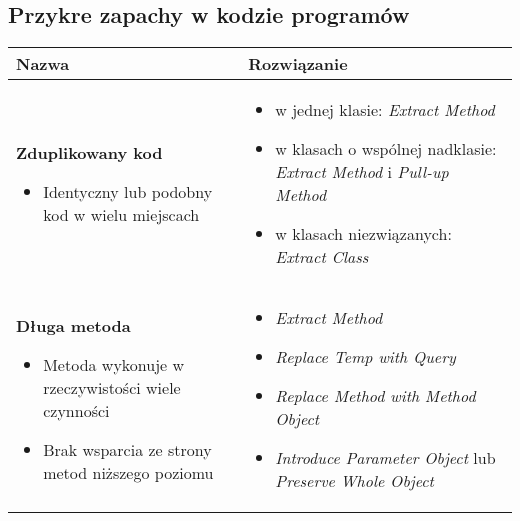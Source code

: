 \documentclass[../main.tex]{subfiles}
\begin{document}
    \subsection{Przykre zapachy w kodzie programów}

    \begin{table}[H]
        \begin{center}
            \begin{tabular}{ p{.35\linewidth} p{.65\linewidth} }
                \toprule
                \textbf{Nazwa} & \textbf{Rozwiązanie}\\
                \toprule
                \textbf{Zduplikowany kod}
                \begin{itemize}
                    \item Identyczny lub podobny kod w wielu miejscach
                \end{itemize}
                &
                \begin{itemize}
                    \item w jednej klasie: \textit{Extract Method}
                    \item w klasach o wspólnej nadklasie: \textit{Extract Method} i \textit{Pull-up Method}
                    \item w klasach niezwiązanych: \textit{Extract Class}
                \end{itemize}
                \\

                \cmidrule(r){1-1}\cmidrule(l){2-2}
                \textbf{Długa metoda}

                \begin{itemize}
                    \item Metoda wykonuje w rzeczywistości wiele czynności
                    \item Brak wsparcia ze strony metod niższego poziomu
                \end{itemize}
                &
                \begin{itemize}
                    \item \textit{Extract Method}
                    \item \textit{Replace Temp with Query}
                    \item \textit{Replace Method with Method Object}
                    \item \textit{Introduce Parameter Object} lub \textit{Preserve Whole Object}
                \end{itemize}
                \\


\end{tabular}
\end{center}
\end{table}
\end{document}
